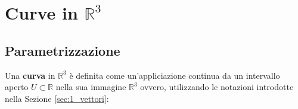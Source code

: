\section{Curve in $\mathbb{R}^3$}

\subsection{Parametrizzazione}

\begin{definition}[Curva]
    Una \textbf{curva} in $\mathbb{R}^3$ è definita come un'appliciazione continua da un intervallo aperto $U \subset \mathbb{R}$ nella sua immagine $\mathbb{R}^3$
    ovvero, utilizzando le notazioni introdotte nella Sezione \ref{sec:1_vettori}:
\end{definition}

